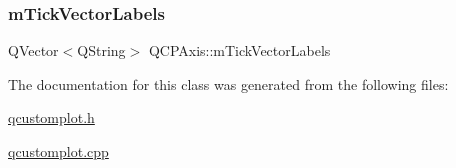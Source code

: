\mbox{\label{class_q_c_p_axis_aeee4bd0fca3f587eafe33843d1cb4f82}} 
\subsubsection{\texorpdfstring{m\+Tick\+Vector\+Labels}{mTickVectorLabels}}
{\footnotesize\ttfamily Q\+Vector$<$Q\+String$>$ Q\+C\+P\+Axis\+::m\+Tick\+Vector\+Labels\hspace{0.3cm}{\ttfamily [protected]}}



The documentation for this class was generated from the following files\+:\begin{DoxyCompactItemize}
\item 
\hyperlink{qcustomplot_8h}{qcustomplot.\+h}\item 
\hyperlink{qcustomplot_8cpp}{qcustomplot.\+cpp}\end{DoxyCompactItemize}

